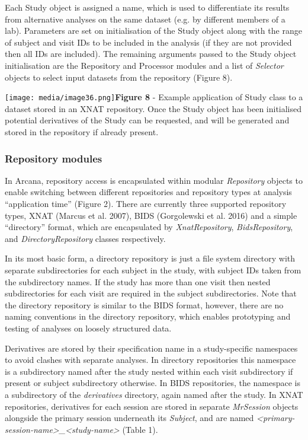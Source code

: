 Each Study object is assigned a name, which is used to differentiate its
results from alternative analyses on the same dataset (e.g. by different
members of a lab). Parameters are set on initialisation of the Study
object along with the range of subject and visit IDs to be included in
the analysis (if they are not provided then all IDs are included). The
remaining arguments passed to the Study object initialisation are the
Repository and Processor modules and a list of \emph{Selector} objects
to select input datasets from the repository (Figure 8).

\texttt{[image: media/image36.png]}\textbf{Figure
8} - Example application of Study class to a dataset stored in an XNAT
repository. Once the Study object has been initialised potential
derivatives of the Study can be requested, and will be generated and
stored in the repository if already present.

\hypertarget{repository-modules}{%
\subsubsection{Repository modules}\label{repository-modules}}

In Arcana, repository access is encapsulated within modular
\emph{Repository} objects to enable switching between different
repositories and repository types at analysis ``application time''
(Figure 2). There are currently three supported repository types, XNAT
(Marcus et al. 2007), BIDS (Gorgolewski et al. 2016) and a simple
``directory'' format, which are encapsulated by \emph{XnatRepository},
\emph{BidsRepository}, and \emph{DirectoryRepository} classes
respectively.

In its most basic form, a directory repository is just a file system
directory with separate subdirectories for each subject in the study,
with subject IDs taken from the subdirectory names. If the study has
more than one visit then nested subdirectories for each visit are
required in the subject subdirectories. Note that the directory
repository is similar to the BIDS format, however, there are no naming
conventions in the directory repository, which enables prototyping and
testing of analyses on loosely structured data.

Derivatives are stored by their specification name in a study-specific
namespaces to avoid clashes with separate analyses. In directory
repositories this namespace is a subdirectory named after the study
nested within each visit subdirectory if present or subject subdirectory
otherwise. In BIDS repositories, the namespace is a subdirectory of the
\emph{derivatives} directory, again named after the study. In XNAT
repositories, derivatives for each session are stored in separate
\emph{MrSession} objects alongside the primary session underneath its
\emph{Subject}, and are named
\emph{\textless{}primary-session-name\textgreater{}\_\textless{}study-name\textgreater{}}
(Table 1).

